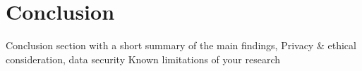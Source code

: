 \section{Conclusion}

Conclusion section with a short summary of the main findings, Privacy \& ethical consideration, data security Known limitations of your research